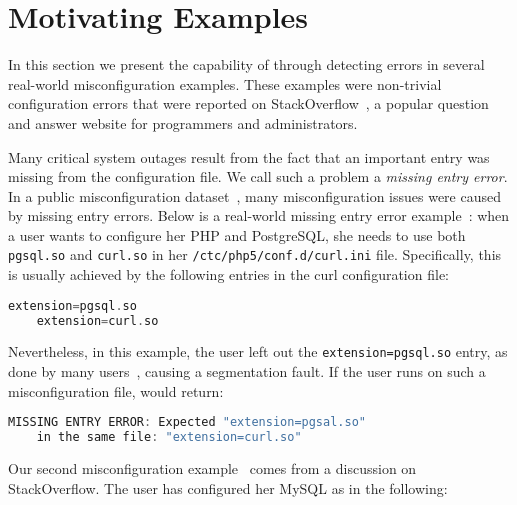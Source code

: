 \section{Motivating Examples}
\label{sec-motiv}

In this section we present the capability of \app through 
detecting errors in several real-world misconfiguration examples. 
These examples were non-trivial configuration errors
that were reported on StackOverflow~\cite{stackoverflow},
a popular question and answer website for programmers and administrators. 

Many critical system outages result from the fact that an important
entry was missing from the configuration file. 
We call such a problem a {\em missing entry error}.
In a public misconfiguration dataset~\cite{configdataset},
many misconfiguration issues were caused by
missing entry errors.
Below is a real-world missing entry error example~\cite{missingentry}:
when a user wants to configure her PHP and PostgreSQL,
she needs to use both {\tt pgsql.so} and {\tt curl.so}
in her {\tt /ctc/php5/conf.d/curl.ini} file.
Specifically, this is usually
achieved by the following entries in 
the curl configuration file:

\begin{lstlisting}[language=C, xleftmargin=.01\textwidth]
    extension=pgsql.so
    extension=curl.so
\end{lstlisting} 

Nevertheless, in this example, the user 
left out the {\tt extension=pgsql.so} entry, 
as done by many users~\cite{yin11anempirical, missingentry}, 
causing a segmentation fault. 
If the user runs \app on such a misconfiguration file,
\app would return:

\begin{lstlisting}[language=C, xleftmargin=.01\textwidth]
    MISSING ENTRY ERROR: Expected "extension=pgsal.so"
    in the same file: "extension=curl.so"
\end{lstlisting} 

\label{ex:fine}
Our second misconfiguration example~\cite{correlation} 
comes from a discussion on StackOverflow.
The user has configured her MySQL as in the following:

